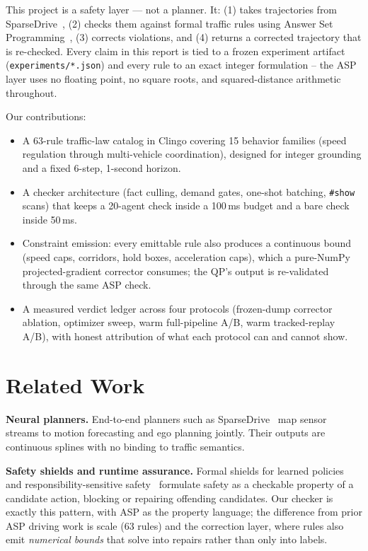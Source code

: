 \documentclass[11pt]{article}
\begin{document}
This project is a safety layer --- not a planner. It: (1) takes
trajectories from SparseDrive~\cite{sparsedrive}, (2) checks them
against formal traffic rules using Answer Set
Programming~\cite{clingo}, (3) corrects violations, and (4) returns a
corrected trajectory that is re-checked. Every claim in this report
is tied to a frozen experiment artifact (\texttt{experiments/*.json})
and every rule to an exact integer formulation -- the ASP layer uses
no floating point, no square roots, and squared-distance arithmetic
throughout.

Our contributions:
\begin{itemize}
  \item A 63-rule traffic-law catalog in Clingo covering 15 behavior
  families (speed regulation through multi-vehicle coordination),
  designed for integer grounding and a fixed 6-step, 1-second horizon.
  \item A checker architecture (fact culling, demand gates, one-shot
  batching, \texttt{\#show} scans) that keeps a 20-agent check inside
  a 100\,ms budget and a bare check inside 50\,ms.
  \item Constraint emission: every emittable rule also produces a
  continuous bound (speed caps, corridors, hold boxes, acceleration
  caps), which a pure-NumPy projected-gradient corrector consumes;
  the QP's output is re-validated through the same ASP check.
  \item A measured verdict ledger across four protocols (frozen-dump
  corrector ablation, optimizer sweep, warm full-pipeline A/B, warm
  tracked-replay A/B), with honest attribution of what each protocol
  can and cannot show.
\end{itemize}

\section{Related Work}
\label{sec:related}

\textbf{Neural planners.} End-to-end planners such as
SparseDrive~\cite{sparsedrive} map sensor streams to motion
forecasting and ego planning jointly. Their outputs are continuous
splines with no binding to traffic semantics.

\textbf{Safety shields and runtime assurance.} Formal shields for
learned policies~\cite{alshiekh2018safe} and responsibility-sensitive
safety~\cite{rss} formulate safety as a checkable property of a
candidate action, blocking or repairing offending candidates. Our
checker is exactly this pattern, with ASP as the property language;
the difference from prior ASP driving work is scale (63 rules) and
the correction layer, where rules also emit \emph{numerical bounds}
that solve into repairs rather than only into labels.
\end{document}
